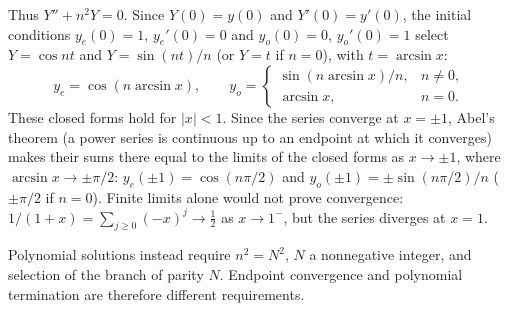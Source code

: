 Thus $Y''+n^2Y=0$. Since $Y(0)=y(0)$ and $Y'(0)=y'(0)$, the initial
conditions $y_e(0)=1$, $y_e'(0)=0$ and $y_o(0)=0$, $y_o'(0)=1$ select
$Y=\cos nt$ and $Y=\sin(nt)/n$ (or $Y=t$ if $n=0$), with
$t=\arcsin x$:
\[
y_e=\cos(n\arcsin x),\qquad
y_o=\begin{cases}\sin(n\arcsin x)/n,&n\ne0,\\\arcsin x,&n=0.
\end{cases}
\]
These closed forms hold for $|x|<1$.  Since the series converge at
$x=\pm1$, Abel's theorem (a power series is continuous up to an
endpoint at which it converges) makes their sums there equal to the
limits of the closed forms as $x\to\pm1$, where $\arcsin x\to\pm\pi/2$:
$y_e(\pm1)=\cos(n\pi/2)$ and $y_o(\pm1)=\pm\sin(n\pi/2)/n$
($\pm\pi/2$ if $n=0$).  Finite limits alone would not prove
convergence: $1/(1+x)=\sum_{j\ge0}(-x)^j\to\frac12$ as $x\to1^-$, but
the series diverges at $x=1$.

Polynomial solutions instead
require $n^2=N^2$, $N$ a nonnegative integer, and selection of the
branch of parity $N$.  Endpoint convergence and polynomial
termination are therefore different requirements.


